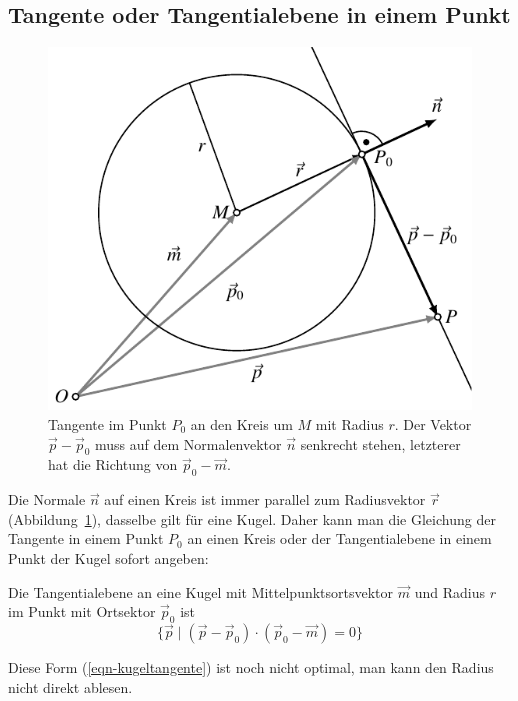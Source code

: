 %
%
\subsection{Tangente oder Tangentialebene in einem Punkt}
\begin{figure}
\centering
\includegraphics{4/images/tangente.pdf}
\caption{Tangente im Punkt $P_0$ an den Kreis um $M$ mit Radius $r$.
Der Vektor $\vec{p}-\vec{p}_0$ muss auf dem
Normalenvektor $\vec{n}$ senkrecht stehen, letzterer hat die Richtung
von $
\vec{p}_0-\vec{m}$.
\label{tangente-graphik}}
\end{figure}
Die Normale $\vec{n}$ auf einen Kreis ist immer parallel zum Radiusvektor
$\vec{r}$
(Abbildung~\ref{tangente-graphik}),
dasselbe gilt für eine Kugel.
Daher kann
man die Gleichung der Tangente in einem Punkt $P_0$ an einen Kreis
oder der Tangentialebene in einem Punkt der Kugel sofort angeben:
\begin{satz}\label{kugeltangentialebene}
Die Tangentialebene an eine Kugel mit Mittelpunktsortsvektor
$\vec m$ und Radius  $r$ im Punkt mit Ortsektor $\vec p_0$ ist
\begin{equation}
\{\vec p\;|\;
(\vec p-\vec p_0)\cdot(\vec p_0-\vec m)=0
\}
\label{eqn-kugeltangente}
\end{equation}
\end{satz}
Diese Form (\ref{eqn-kugeltangente}) ist noch nicht optimal, man kann den
Radius nicht direkt ablesen.

